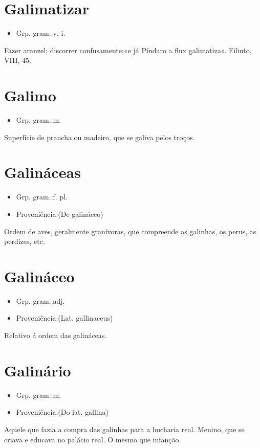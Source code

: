 \section{Galimatizar}
\begin{itemize}
\item {Grp. gram.:v. i.}
\end{itemize}
Fazer aranzel; discorrer confusamente:«\textunderscore e já Píndaro a flux galimatiza\textunderscore ». Filinto, VIII, 45.
\section{Galimo}
\begin{itemize}
\item {Grp. gram.:m.}
\end{itemize}
Superfície de prancha ou madeiro, que se galiva pelos troços.
\section{Galináceas}
\begin{itemize}
\item {Grp. gram.:f. pl.}
\end{itemize}
\begin{itemize}
\item {Proveniência:(De \textunderscore galináceo\textunderscore )}
\end{itemize}
Ordem de aves, geralmente granívoras, que compreende as galinhas, os perus, as perdizes, etc.
\section{Galináceo}
\begin{itemize}
\item {Grp. gram.:adj.}
\end{itemize}
\begin{itemize}
\item {Proveniência:(Lat. \textunderscore gallinaceus\textunderscore )}
\end{itemize}
Relativo á ordem das galináceas.
\section{Galinário}
\begin{itemize}
\item {Grp. gram.:m.}
\end{itemize}
\begin{itemize}
\item {Proveniência:(Do lat. \textunderscore gallina\textunderscore )}
\end{itemize}
Aquele que fazia a compra das galinhas para a hucharia real.
Menino, que se criava e educava no palácio real.
O mesmo que \textunderscore infanção\textunderscore .
